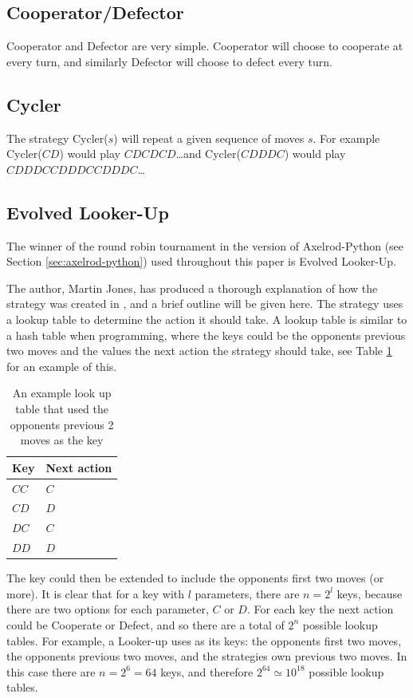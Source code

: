 \subsection{Cooperator/Defector}\label{ssec:strat_coop_defect}
Cooperator and Defector are very simple.
Cooperator will choose to cooperate at every turn, and similarly Defector will choose to defect every turn.

\subsection{Cycler}\label{ssec:strat_cycler}
The strategy Cycler($s$) will repeat a given sequence of moves $s$.
For example Cycler($CD$) would play $CDCDCD$\dots and Cycler($CDDDC$) would play $CDDDCCDDDCCDDDC$\dots

\subsection{Evolved Looker-Up}\label{ssec:strat_evolved_lu}
The winner of the round robin tournament in the version of Axelrod-Python (see Section \ref{sec:axelrod-python}) used throughout this paper is Evolved Looker-Up.

The author, Martin Jones, has produced a thorough explanation of how the strategy was created in \cite{MoJones}, and a brief outline will be given here.
The strategy uses a lookup table to determine the action it should take.
A lookup table is similar to a hash table when programming, where the keys could be the opponents previous two moves and the values the next action the strategy should take, see Table \ref{tab:lookup_table} for an example of this.

\begin{table}[htbp!]
    \centering
    \begin{tabular}{l l}
        \toprule
        Key & Next action \\
        \midrule
        $CC$ & $C$ \\
        $CD$ & $D$ \\
        $DC$ & $C$ \\
        $DD$ & $D$ \\
        \bottomrule
    \end{tabular}
    \caption{An example look up table that used the opponents previous 2 moves as the key}
    \label{tab:lookup_table}
\end{table}

The key could then be extended to include the opponents first two moves (or more).
It is clear that for a key with $l$ parameters, there are $n = 2^l$ keys, because there are two options for each parameter, $C$ or $D$.
For each key the next action could be Cooperate or Defect, and so there are a total of $2^n$ possible lookup tables.
For example, a Looker-up uses as its keys: the opponents first two moves, the opponents previous two moves, and the strategies own previous two moves.
In this case there are $n = 2^6 = 64$ keys, and therefore $2^{64} \simeq 10^{18}$ possible lookup tables.

